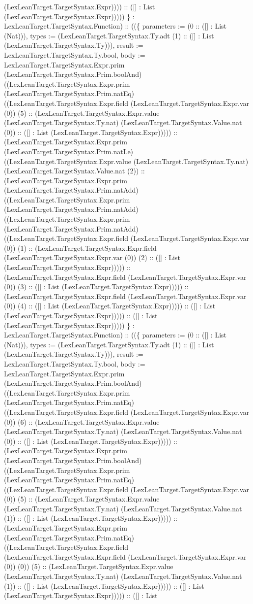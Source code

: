 \documentclass[11pt]{article}
\begin{document}
(LexLeanTarget.TargetSyntax.Expr)))) :: ([] : List (LexLeanTarget.TargetSyntax.Expr))))) \} : LexLeanTarget.TargetSyntax.Function) :: ((\{ parameters := (0 :: ([] : List (Nat))), types := (LexLeanTarget.TargetSyntax.Ty.adt (1) :: ([] : List (LexLeanTarget.TargetSyntax.Ty))), result := LexLeanTarget.TargetSyntax.Ty.bool, body := LexLeanTarget.TargetSyntax.Expr.prim (LexLeanTarget.TargetSyntax.Prim.boolAnd) ((LexLeanTarget.TargetSyntax.Expr.prim (LexLeanTarget.TargetSyntax.Prim.natEq) ((LexLeanTarget.TargetSyntax.Expr.field (LexLeanTarget.TargetSyntax.Expr.var (0)) (5) :: (LexLeanTarget.TargetSyntax.Expr.value (LexLeanTarget.TargetSyntax.Ty.nat) (LexLeanTarget.TargetSyntax.Value.nat (0)) :: ([] : List (LexLeanTarget.TargetSyntax.Expr))))) :: (LexLeanTarget.TargetSyntax.Expr.prim (LexLeanTarget.TargetSyntax.Prim.natLe) ((LexLeanTarget.TargetSyntax.Expr.value (LexLeanTarget.TargetSyntax.Ty.nat) (LexLeanTarget.TargetSyntax.Value.nat (2)) :: (LexLeanTarget.TargetSyntax.Expr.prim (LexLeanTarget.TargetSyntax.Prim.natAdd) ((LexLeanTarget.TargetSyntax.Expr.prim (LexLeanTarget.TargetSyntax.Prim.natAdd) ((LexLeanTarget.TargetSyntax.Expr.prim (LexLeanTarget.TargetSyntax.Prim.natAdd) ((LexLeanTarget.TargetSyntax.Expr.field (LexLeanTarget.TargetSyntax.Expr.var (0)) (1) :: (LexLeanTarget.TargetSyntax.Expr.field (LexLeanTarget.TargetSyntax.Expr.var (0)) (2) :: ([] : List (LexLeanTarget.TargetSyntax.Expr))))) :: (LexLeanTarget.TargetSyntax.Expr.field (LexLeanTarget.TargetSyntax.Expr.var (0)) (3) :: ([] : List (LexLeanTarget.TargetSyntax.Expr))))) :: (LexLeanTarget.TargetSyntax.Expr.field (LexLeanTarget.TargetSyntax.Expr.var (0)) (4) :: ([] : List (LexLeanTarget.TargetSyntax.Expr))))) :: ([] : List (LexLeanTarget.TargetSyntax.Expr))))) :: ([] : List (LexLeanTarget.TargetSyntax.Expr))))) \} : LexLeanTarget.TargetSyntax.Function) :: ((\{ parameters := (0 :: ([] : List (Nat))), types := (LexLeanTarget.TargetSyntax.Ty.adt (1) :: ([] : List (LexLeanTarget.TargetSyntax.Ty))), result := LexLeanTarget.TargetSyntax.Ty.bool, body := LexLeanTarget.TargetSyntax.Expr.prim (LexLeanTarget.TargetSyntax.Prim.boolAnd) ((LexLeanTarget.TargetSyntax.Expr.prim (LexLeanTarget.TargetSyntax.Prim.natEq) ((LexLeanTarget.TargetSyntax.Expr.field (LexLeanTarget.TargetSyntax.Expr.var (0)) (6) :: (LexLeanTarget.TargetSyntax.Expr.value (LexLeanTarget.TargetSyntax.Ty.nat) (LexLeanTarget.TargetSyntax.Value.nat (0)) :: ([] : List (LexLeanTarget.TargetSyntax.Expr))))) :: (LexLeanTarget.TargetSyntax.Expr.prim (LexLeanTarget.TargetSyntax.Prim.boolAnd) ((LexLeanTarget.TargetSyntax.Expr.prim (LexLeanTarget.TargetSyntax.Prim.natEq) ((LexLeanTarget.TargetSyntax.Expr.field (LexLeanTarget.TargetSyntax.Expr.var (0)) (5) :: (LexLeanTarget.TargetSyntax.Expr.value (LexLeanTarget.TargetSyntax.Ty.nat) (LexLeanTarget.TargetSyntax.Value.nat (1)) :: ([] : List (LexLeanTarget.TargetSyntax.Expr))))) :: (LexLeanTarget.TargetSyntax.Expr.prim (LexLeanTarget.TargetSyntax.Prim.natEq) ((LexLeanTarget.TargetSyntax.Expr.field (LexLeanTarget.TargetSyntax.Expr.field (LexLeanTarget.TargetSyntax.Expr.var (0)) (0)) (5) :: (LexLeanTarget.TargetSyntax.Expr.value (LexLeanTarget.TargetSyntax.Ty.nat) (LexLeanTarget.TargetSyntax.Value.nat (1)) :: ([] : List (LexLeanTarget.TargetSyntax.Expr))))) :: ([] : List (LexLeanTarget.TargetSyntax.Expr))))) :: ([] : List 
\end{document}
